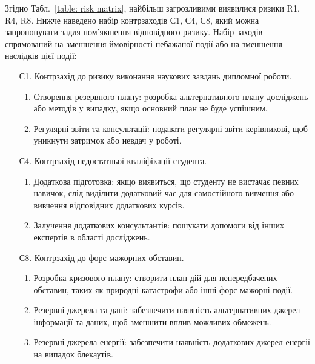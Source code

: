 \documentclass{mathreport}
\begin{document}
Згідно Табл.~\ref{table: risk matrix}, найбільш загрозливими виявилися ризики R1, R4, R8. Нижче наведено набір контрзаходів С1, С4, С8, який можна запропонувати задля пом'якшення відповідного ризику. Набір заходів спрямований на зменшення ймовірності небажаної події або на зменшення наслідків цієї події:
\begin{enumerate}[label=\arabic*.]
    \item[С1.] Контрзахід до ризику виконання наукових завдань дипломної роботи.
    \begin{enumerate}[label=С1.\arabic{enumii}]
        \item Створення резервного плану: pозробка альтернативного плану досліджень або методів у випадку, якщо основний план не буде успішним.
        \item Регулярні звіти та консультації: подавати регулярні звіти керівникові, щоб уникнути затримок або невдач у роботі.
    \end{enumerate}
    \item[С4.] Контрзахід недостатньої кваліфікації студента.
    \begin{enumerate}[label=С4.\arabic{enumii}]
        \item Додаткова підготовка: якщо виявиться, що студенту не вистачає певних навичок, слід виділити додатковий час для самостійного вивчення або вивчення відповідних додаткових курсів.
        \item Залучення додаткових консультантів: пошукати допомоги від інших експертів в області досліджень.
    \end{enumerate}
    \item[С8.] Контрзахід до форс-мажорних обставин.
    \begin{enumerate}[label=С8.\arabic{enumii}]
        \item Розробка кризового плану: створити план дій для непередбачених обставин, таких як природні катастрофи або інші форс-мажорні події.
        \item Резервні джерела та дані: забезпечити наявність альтернативних джерел інформації та даних, щоб зменшити вплив можливих обмежень.
        \item Резервні джерела енергії: забезпечити наявність додаткових джерел енергії на випадок блекаутів.
    \end{enumerate}
\end{enumerate}

\end{document}
